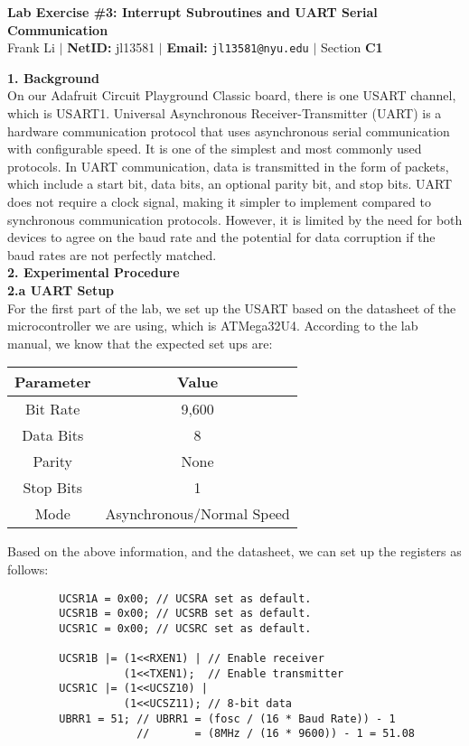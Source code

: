 \documentclass{report}
\begin{document}
\begin{center}
    \textbf{\huge Lab Exercise \#3: Interrupt Subroutines and UART Serial Communication} \\[1em]
    Frank Li $|$
    \textbf{NetID:} jl13581 $|$
    \textbf{Email:} \texttt{jl13581@nyu.edu} $|$
    Section \textbf{C1} \\ [1em]
\end{center}
    {\Large \textbf{1. Background}}\\[0.5em]
    On our Adafruit Circuit Playground Classic board, there is one USART channel, which is USART1. Universal Asynchronous Receiver-Transmitter (UART) is a hardware communication protocol that uses asynchronous serial communication with configurable speed. It is one of the simplest and most commonly used protocols. In UART communication, data is transmitted in the form of packets, which include a start bit, data bits, an optional parity bit, and stop bits. UART does not require a clock signal, making it simpler to implement compared to synchronous communication protocols. However, it is limited by the need for both devices to agree on the baud rate and the potential for data corruption if the baud rates are not perfectly matched.\\[1em]
    {\Large \textbf{2. Experimental Procedure}}\\[0.5em]
    {\Large \textbf{2.a UART Setup}}\\[0.5em]
    For the first part of the lab, we set up the USART based on the datasheet of the microcontroller we are using, which is ATMega32U4. According to the lab manual, we know that the expected set ups are:
    \begin{center}
        \begin{tabular}{|c|c|}
        \hline
        \textbf{Parameter} & \textbf{Value} \\
        \hline
        Bit Rate & 9,600 \\
        \hline
        Data Bits & 8 \\
        \hline
        Parity & None \\
        \hline
        Stop Bits & 1 \\
        \hline
        Mode & Asynchronous/Normal Speed \\
        \hline
        \end{tabular}
    \end{center}
    Based on the above information, and the datasheet, we can set up the registers as follows:
    \begin{verbatim}
        UCSR1A = 0x00; // UCSRA set as default. 
        UCSR1B = 0x00; // UCSRB set as default.
        UCSR1C = 0x00; // UCSRC set as default.
    
        UCSR1B |= (1<<RXEN1) | // Enable receiver
                  (1<<TXEN1);  // Enable transmitter
        UCSR1C |= (1<<UCSZ10) |
                  (1<<UCSZ11); // 8-bit data
        UBRR1 = 51; // UBRR1 = (fosc / (16 * Baud Rate)) - 1
                    //       = (8MHz / (16 * 9600)) - 1 = 51.08 
    \end{verbatim}
\end{document}

